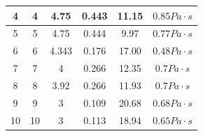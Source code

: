 \documentclass{article}
\begin{document}
\begin{table}[h]
\begin{tabular}{|c|c|c|c|c|c|}
4                                                    & 4                                                  & 4.75                                                            & 0.443                                                      & 11.15                                                             &  $0.85 Pa\cdot s$                                                                \\ \hline
5                                                    & 5                                                  & 4.75                                                            & 0.444                                                      & 9.97                                                              &  $0.77 Pa\cdot s$                                                                \\ \hline
6                                                    & 6                                                  & 4.343                                                           & 0.176                                                      & 17.00                                                             & $0.48 Pa\cdot s$                                                                  \\ \hline
7                                                    & 7                                                  & 4                                                               & 0.266                                                      & 12.35                                                             & $0.7 Pa\cdot s$                                                                  \\ \hline
8                                                    & 8                                                  & 3.92                                                            & 0.266                                                      & 11.93                                                             &  $0.7 Pa\cdot s$                                                                  \\ \hline
9                                                    & 9                                                  & 3                                                               & 0.109                                                      & 20.68                                                             & $0.68 Pa\cdot s$                                                                    \\ \hline
10                                                   & 10                                                 & 3                                                               & 0.113                                                      & 18.94                                                             & $0.65 Pa\cdot s$                                                                   \\ \hline
\end{tabular}
\end{table}
\end{document}
